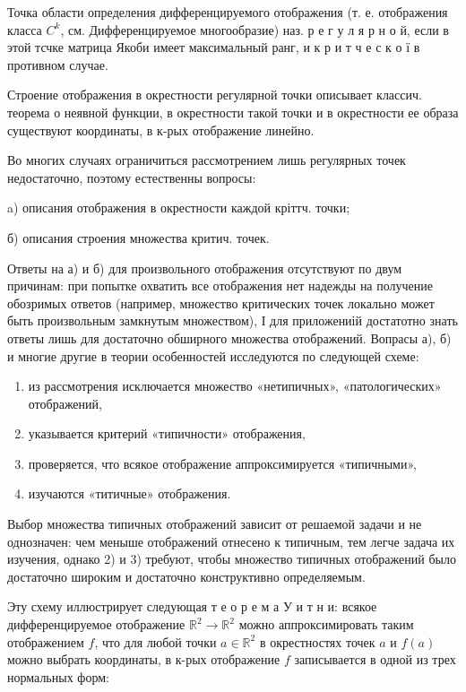 \documentclass[10pt]{article}
\begin{document}
Точка области определения дифференцируемого отображения (т. е. отображения класса $C^{k}$, см. Дифференцируемое многообразие) наз. р е г у л я р н о й, если в этой тсчке матрица Якоби имеет максимальный ранг, и к р и т ч е с к о ї в противном случае.

Строение отображения в окрестности регулярной точки описывает классич. теорема о неявной функции, в окрестности такой точки и в окрестности ее образа существуют координаты, в к-рых отображение линейно.

Во многих случаях ограничиться рассмотрением лишь регулярных точек недостаточно, поэтому естественны вопросы:

a) описания отображения в окрестности каждой кріттч. точки;

б) описания строения множества критич. точек.

Ответы на а) и б) для произвольного отображения отсутствуют по двум причинам: при попытке охватить все отображения нет надежды на получение обозримых ответов (например, множество критических точек локально может быть произвольным замкнутым множеством), І для приложениій достатотно знать ответы лишь для достаточно обширного множества отображений. Вопрасы а), б) и многие другие в теории особенностей исследуются по следующей схеме:

\begin{enumerate}
  \item из рассмотрения исключается множество «нетипичных», «патологических» отображений,

  \item указывается критерий «типичности» отображения,

  \item проверяется, что всякое отображение аппроксимируется «типичными»,

  \item изучаются «титичные» отображения.

\end{enumerate}

Выбор множества типичных отображений зависит от решаемой задачи и не однозначен: чем меныше отображений отнесено к типичным, тем легче задача их изучения, однако 2) и 3) требуют, чтобы множество типичных отображений было достаточно широким и достаточно конструктивно определяемым.

Эту схему иллюстрирует следующая т е о р е м а У и т н и: всякое дифференцируемое отображение $\mathbb{R}^{2} \rightarrow \mathbb{R}^{2}$ можно аппроксимировать таким отображением $f$, что для любой точки $a \in \mathbb{R}^{2}$ в окрестностях точек $a$ и $f(a)$ можно выбрать координаты, в к-рых отображение $f$ записывается в одной из трех нормальных форм:
\end{document}
